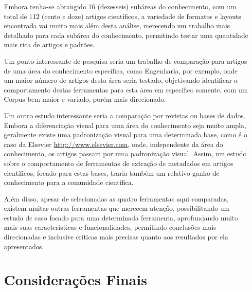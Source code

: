

Embora tenha-se abrangido 16 (dezesseis) subáreas do conhecimento, com um total de 112 (cento e doze) artigos científicos, a variedade de formatos e layouts encontrada vai muito mais além desta análise, merecendo um trabalho mais detalhado para cada subárea do conhecimento, permitindo testar uma quantidade mais rica de artigos e padrões.

Um ponto interessante de pesquisa seria um trabalho de comparação para artigos de uma área do conhecimento específica, como Engenharia, por exemplo, onde um maior número de artigos desta área seria testado, objetivando identificar o comportamento destas ferramentas para esta área em específico somente, com um Corpus bem maior e variado, porém mais direcionado.


Um outro estudo interessante seria a comparação por revistas ou bases de dados. Embora a diferenciação visual para uma área do conhecimento seja muito ampla, geralmente existe uma padronização visual para uma determinada base, como é o caso da Elsevier \url{http://www.elsevier.com}, onde, independente da área do conhecimento, os artigos passam por uma padronização visual. Assim, um estudo sobre o comportamento de ferramentas de extração de metadados em artigos científicos, focado para estas bases, traria também um relativo ganho de conhecimento para a comunidade científica.

Além disso, apesar de selecionadas as quatro ferramentas aqui comparadas, existem muitas outras ferramentas que merecem atenção, possibilitando um estudo de caso focado para uma determinada ferramenta, aprofundando muito mais suas características e funcionalidades, permitindo conclusões mais direcionadas e inclusive críticas mais precisas quanto aos resultados por ela apresentados.


\section{Considerações Finais}
\label{sec:final-considerations}

